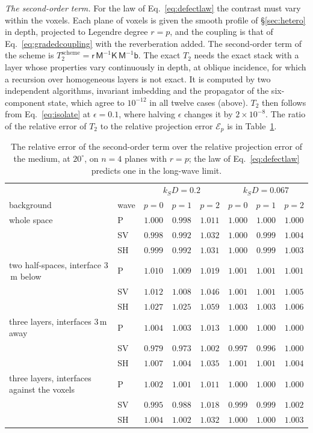 \documentclass[preprint,review,12pt]{elsarticle}
\begin{document}
\emph{The second-order term.} For the law of Eq.~\eqref{eq:defectlaw} the contrast must vary within
the voxels. Each plane of voxels is given the smooth profile of \S\ref{sec:hetero} in depth, projected
to Legendre degree $r=p$, and the coupling is that of Eq.~\eqref{eq:gradedcoupling} with the
reverberation added. The second-order term of the scheme is
$T_2^{\text{scheme}}=\mathsf{r}\,\mathsf{M}^{-1}\mathsf{K}\,\mathsf{M}^{-1}\mathsf{b}$. The exact $T_2$
needs the exact stack with a layer whose properties vary continuously in depth, at oblique incidence,
for which a recursion over homogeneous layers is not exact. It is computed by two independent algorithms, invariant imbedding \citep{Haines2004} and the
propagator of the six-component state, which agree to $10^{-12}$ in all twelve cases
(above). $T_2$ then follows
from Eq.~\eqref{eq:isolate} at $\epsilon=0.1$, where halving $\epsilon$ changes it by $2\times10^{-8}$. The ratio of the relative error of $T_2$ to the
relative projection error $\mathcal{E}_p$ is in Table~\ref{tab:obliquelaw}.
\begin{table}[htbp]
\centering
\caption{The relative error of the second-order term over the relative projection error of the medium,
at $20^\circ$, on $n=4$ planes with $r=p$; the law of Eq.~\eqref{eq:defectlaw} predicts one in the
long-wave limit.}\label{tab:obliquelaw}
\small\setlength{\tabcolsep}{4pt}
\begin{tabular}{@{}llcccccc@{}}
\toprule
 & & \multicolumn{3}{c}{$k_SD=0.2$} & \multicolumn{3}{c}{$k_SD=0.067$} \\
background & wave & $p=0$ & $p=1$ & $p=2$ & $p=0$ & $p=1$ & $p=2$ \\
\midrule
whole space & P & $1.000$ & $0.998$ & $1.011$ & $1.000$ & $1.000$ & $1.000$ \\
 & SV & $0.998$ & $0.992$ & $1.032$ & $1.000$ & $0.999$ & $1.004$ \\
 & SH & $0.999$ & $0.992$ & $1.031$ & $1.000$ & $0.999$ & $1.003$ \\
two half-spaces, interface $3$\,m below & P & $1.010$ & $1.009$ & $1.019$ & $1.001$ & $1.001$ & $1.001$ \\
 & SV & $1.012$ & $1.008$ & $1.046$ & $1.001$ & $1.001$ & $1.005$ \\
 & SH & $1.027$ & $1.025$ & $1.059$ & $1.003$ & $1.003$ & $1.006$ \\
three layers, interfaces $3$\,m away & P & $1.004$ & $1.003$ & $1.013$ & $1.000$ & $1.000$ & $1.000$ \\
 & SV & $0.979$ & $0.973$ & $1.002$ & $0.997$ & $0.996$ & $1.000$ \\
 & SH & $1.007$ & $1.004$ & $1.035$ & $1.001$ & $1.001$ & $1.004$ \\
three layers, interfaces against the voxels & P & $1.002$ & $1.001$ & $1.011$ & $1.000$ & $1.000$ & $1.000$ \\
 & SV & $0.995$ & $0.988$ & $1.018$ & $0.999$ & $0.999$ & $1.002$ \\
 & SH & $1.004$ & $1.002$ & $1.032$ & $1.000$ & $1.000$ & $1.003$ \\
\bottomrule
\end{tabular}
\end{table}
\end{document}

